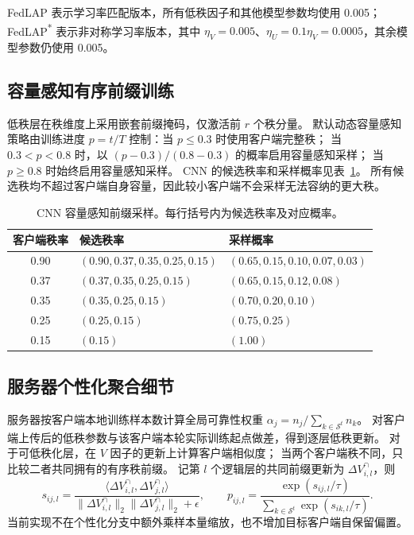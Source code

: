FedLAP 表示学习率匹配版本，所有低秩因子和其他模型参数均使用 0.005；
FedLAP\textsuperscript{*} 表示非对称学习率版本，其中
$\eta_V=0.005$、$\eta_U=0.1\eta_V=0.0005$，其余模型参数仍使用 0.005。

\subsection{容量感知有序前缀训练}

低秩层在秩维度上采用嵌套前缀掩码，仅激活前 $r$ 个秩分量。
默认动态容量感知策略由训练进度 $p=t/T$ 控制：当 $p\leq0.3$ 时使用客户端完整秩；
当 $0.3<p<0.8$ 时，以 $(p-0.3)/(0.8-0.3)$ 的概率启用容量感知采样；
当 $p\geq0.8$ 时始终启用容量感知采样。
CNN 的候选秩率和采样概率见表~\ref{tab:appendix_cnn_dropout}。
所有候选秩均不超过客户端自身容量，因此较小客户端不会采样无法容纳的更大秩。

\begin{table}[t]
\centering
\caption{CNN 容量感知前缀采样。每行括号内为候选秩率及对应概率。}
\label{tab:appendix_cnn_dropout}
\small
\setlength{\tabcolsep}{6pt}
\renewcommand{\arraystretch}{1.10}
\begin{tabularx}{\textwidth}{@{}cXX@{}}
\toprule
\textbf{客户端秩率} & \textbf{候选秩率} & \textbf{采样概率} \\
\midrule
0.90 & $(0.90,0.37,0.35,0.25,0.15)$ & $(0.65,0.15,0.10,0.07,0.03)$ \\
0.37 & $(0.37,0.35,0.25,0.15)$ & $(0.65,0.15,0.12,0.08)$ \\
0.35 & $(0.35,0.25,0.15)$ & $(0.70,0.20,0.10)$ \\
0.25 & $(0.25,0.15)$ & $(0.75,0.25)$ \\
0.15 & $(0.15)$ & $(1.00)$ \\
\bottomrule
\end{tabularx}
\end{table}

\subsection{服务器个性化聚合细节}

服务器按客户端本地训练样本数计算全局可靠性权重
$\alpha_j=n_j/\sum_{k\in\mathcal{S}^t}n_k$。
对客户端上传后的低秩参数与该客户端本轮实际训练起点做差，得到逐层低秩更新。
对于可低秩化层，在 $V$ 因子的更新上计算客户端相似度；
当两个客户端秩不同，只比较二者共同拥有的有序秩前缀。
记第 $l$ 个逻辑层的共同前缀更新为 $\Delta V_{i,l}^{\cap}$，则
\begin{equation}
s_{ij,l}=\frac{\langle\Delta V_{i,l}^{\cap},\Delta V_{j,l}^{\cap}\rangle}
{\lVert\Delta V_{i,l}^{\cap}\rVert_2\lVert\Delta V_{j,l}^{\cap}\rVert_2+\epsilon},
\qquad
p_{ij,l}=\frac{\exp(s_{ij,l}/\tau)}{\sum_{k\in\mathcal{S}^t}\exp(s_{ik,l}/\tau)}.
\end{equation}
当前实现不在个性化分支中额外乘样本量缩放，也不增加目标客户端自保留偏置。

